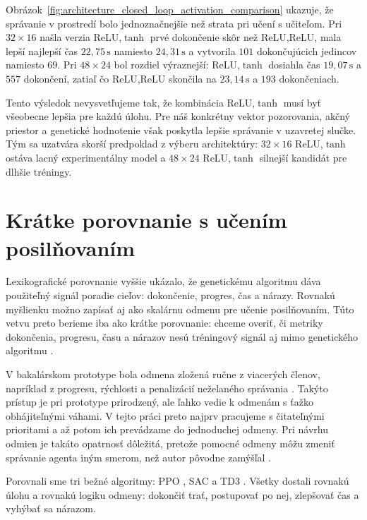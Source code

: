 Obrázok~\ref{fig:architecture_closed_loop_activation_comparison} ukazuje, že správanie v prostredí bolo jednoznačnejšie než strata pri učení s učiteľom. Pri \(32\times16\) našla verzia ReLU,\(\tanh\) prvé dokončenie skôr než ReLU,ReLU, mala lepší najlepší čas \(22{,}75\,\mathrm{s}\) namiesto \(24{,}31\,\mathrm{s}\) a vytvorila \(101\) dokončujúcich jedincov namiesto \(69\). Pri \(48\times24\) bol rozdiel výraznejší: ReLU,\(\tanh\) dosiahla čas \(19{,}07\,\mathrm{s}\) a \(557\) dokončení, zatiaľ čo ReLU,ReLU skončila na \(23{,}14\,\mathrm{s}\) a \(193\) dokončeniach.

Tento výsledok nevysvetľujeme tak, že kombinácia ReLU,\(\tanh\) musí byť všeobecne lepšia pre každú úlohu. Pre náš konkrétny vektor pozorovania, akčný priestor a genetické hodnotenie však poskytla lepšie správanie v uzavretej slučke. Tým sa uzatvára skorší predpoklad z výberu architektúry: \(32\times16\) ReLU,\(\tanh\) ostáva lacný experimentálny model a \(48\times24\) ReLU,\(\tanh\) silnejší kandidát pre dlhšie tréningy.

\FloatBarrier

\section{Krátke porovnanie s učením posilňovaním}

Lexikografické porovnanie vyššie ukázalo, že genetickému algoritmu dáva použiteľný signál poradie cieľov: dokončenie, progres, čas a nárazy. Rovnakú myšlienku možno zapísať aj ako skalárnu odmenu pre učenie posilňovaním. Túto vetvu preto berieme iba ako krátke porovnanie: chceme overiť, či metriky dokončenia, progresu, času a nárazov nesú tréningový signál aj mimo genetického algoritmu \cite{sutton_barto2018rl}.

V bakalárskom prototype bola odmena zložená ručne z viacerých členov, napríklad z progresu, rýchlosti a penalizácií neželaného správania \cite{melkovic2024bachelor}. Takýto prístup je pri prototype prirodzený, ale ľahko vedie k odmenám s ťažko obhájiteľnými váhami. V tejto práci preto najprv pracujeme s čitateľnými prioritami a až potom ich prevádzame do jednoduchej odmeny. Pri návrhu odmien je takáto opatrnosť dôležitá, pretože pomocné odmeny môžu zmeniť správanie agenta iným smerom, než autor pôvodne zamýšľal \cite{ng1999shaping,knox2023reward_misdesign}.

Porovnali sme tri bežné algoritmy: PPO \cite{schulman2017ppo}, SAC \cite{haarnoja2018sac} a TD3 \cite{fujimoto2018td3}. Všetky dostali rovnakú úlohu a rovnakú logiku odmeny: dokončiť trať, postupovať po nej, zlepšovať čas a vyhýbať sa nárazom.

